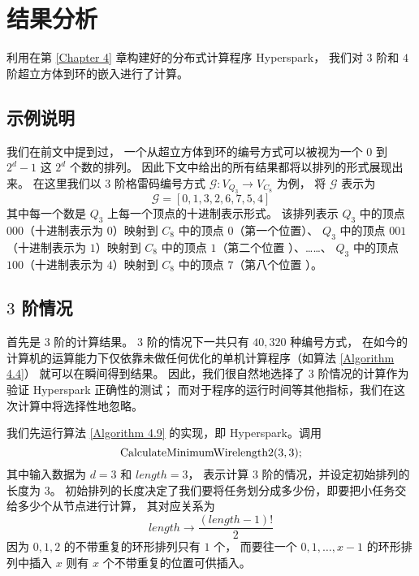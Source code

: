 
\chapter{结果分析}
\label{Chapter 5}

利用在第 \ref{Chapter 4} 章构建好的分布式计算程序 Hyperspark，
我们对 $3$ 阶和 $4$ 阶超立方体到环的嵌入进行了计算。

\section{示例说明}
\label{Section 5.1}

我们在前文中提到过，
一个从超立方体到环的编号方式可以被视为一个 $0$ 到 $2^d - 1$ 这 $2^d$ 个数的排列。
因此下文中给出的所有结果都将以排列的形式展现出来。
在这里我们以 $3$ 阶格雷码编号方式 $\mathcal{G} \colon V_{Q_3} \rightarrow V_{C_8}$ 为例，
将 $\mathcal{G}$ 表示为
\begin{equation*}
\mathcal{G} = [0, 1, 3, 2, 6, 7, 5, 4]
\end{equation*}
其中每一个数是 $Q_3$ 上每一个顶点的十进制表示形式。
该排列表示 $Q_3$ 中的顶点 $000$（十进制表示为 $0$）映射到 $C_8$ 中的顶点 $0$（第一个位置）、
$Q_3$ 中的顶点 $001$（十进制表示为 $1$）映射到 $C_8$ 中的顶点 $1$（第二个位置 ）、……、
$Q_3$ 中的顶点 $100$（十进制表示为 $4$）映射到 $C_8$ 中的顶点 $7$（第八个位置 ）。

\section{$3$ 阶情况}
\label{Section 5.2}

首先是 $3$ 阶的计算结果。
$3$ 阶的情况下一共只有 $40,320$ 种编号方式，
在如今的计算机的运算能力下仅依靠未做任何优化的单机计算程序（如算法 \ref{Algorithm 4.4}）
就可以在瞬间得到结果。
因此，我们很自然地选择了 $3$ 阶情况的计算作为验证 Hyperspark 正确性的测试；
而对于程序的运行时间等其他指标，我们在这次计算中将选择性地忽略。

我们先运行算法 \ref{Algorithm 4.9} 的实现，即 Hyperspark。调用
\begin{equation*}
\textnormal{CalculateMinimumWirelength2}(3, 3);
\end{equation*}
其中输入数据为 $d = 3$ 和 $length = 3$，
表示计算 $3$ 阶的情况，并设定初始排列的长度为 $3$。
初始排列的长度决定了我们要将任务划分成多少份，即要把小任务交给多少个从节点进行计算，
其对应关系为
\begin{equation*}
length \rightarrow \frac{(length - 1)!}{2}
\end{equation*}
因为 $0, 1, 2$ 的不带重复的环形排列只有 $1$ 个，
而要往一个 $0, 1, \dots, x - 1$ 的环形排列中插入 $x$ 则有 $x$ 个不带重复的位置可供插入。

